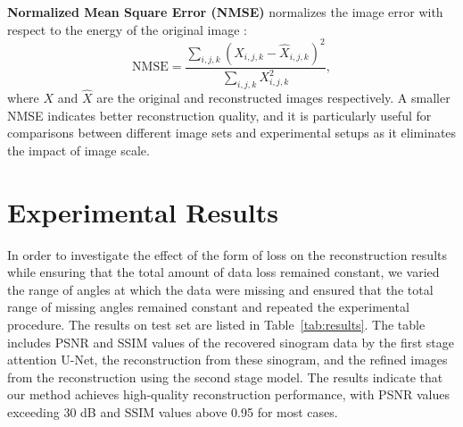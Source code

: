 \documentclass[12pt]{iopart}
\begin{document}
\textbf{Normalized Mean Square Error (NMSE)} normalizes the image error with respect to the energy of the original image \cite{Higashiyama2024NMSE}:
\begin{equation}
\text{NMSE} = \frac{\sum_{i,j,k}(X_{i,j,k} - \hat{X}_{i,j,k})^2}{\sum_{i,j,k}X_{i,j,k}^2},
\end{equation}
where $X$ and $\hat{X}$ are the original and reconstructed images respectively. A smaller NMSE indicates better reconstruction quality, and it is particularly useful for comparisons between different image sets and experimental setups as it eliminates the impact of image scale.




\section{Experimental Results}
\label{chap:results}
In order to investigate the effect of the form of loss on the reconstruction results while ensuring that the total amount of data loss remained constant, we varied the range of angles at which the data were missing and ensured that the total range of missing angles remained constant and repeated the experimental procedure. The results on test set are listed in Table~\ref{tab:results}. 
The table includes PSNR and SSIM values of the recovered sinogram data by the first stage attention U-Net, the reconstruction from these sinogram, and the refined images from the reconstruction using the second stage model. The results indicate that our method achieves high-quality reconstruction performance, with PSNR values exceeding 30 dB and SSIM values above 0.95 for most cases. 
\end{document}
